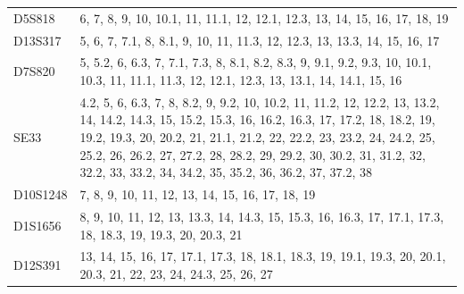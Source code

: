 \begin{theappendices}
\begin{table}[htbp]
\begin{tabularx}{\textwidth}{lX}
  D5S818 &                                                                                                                                                                                                                                                                                   6, 7, 8, 9, 10, 10.1, 11, 11.1, 12, 12.1, 12.3, 13, 14, 15, 16, 17, 18, 19 \\
 D13S317 &                                                                                                                                                                                                                                                                                    5, 6, 7, 7.1, 8, 8.1, 9, 10, 11, 11.3, 12, 12.3, 13, 13.3, 14, 15, 16, 17 \\
  D7S820 &                                                                                                                                                                                                                  5, 5.2, 6, 6.3, 7, 7.1, 7.3, 8, 8.1, 8.2, 8.3, 9, 9.1, 9.2, 9.3, 10, 10.1, 10.3, 11, 11.1, 11.3, 12, 12.1, 12.3, 13, 13.1, 14, 14.1, 15, 16 \\
    SE33 &  4.2, 5, 6, 6.3, 7, 8, 8.2, 9, 9.2, 10, 10.2, 11, 11.2, 12, 12.2, 13, 13.2, 14, 14.2, 14.3, 15, 15.2, 15.3, 16, 16.2, 16.3, 17, 17.2, 18, 18.2, 19, 19.2, 19.3, 20, 20.2, 21, 21.1, 21.2, 22, 22.2, 23, 23.2, 24, 24.2, 25, 25.2, 26, 26.2, 27, 27.2, 28, 28.2, 29, 29.2, 30, 30.2, 31, 31.2, 32, 32.2, 33, 33.2, 34, 34.2, 35, 35.2, 36, 36.2, 37, 37.2, 38 \\
D10S1248 &                                                                                                                                                                                                                                                                                                              7, 8, 9, 10, 11, 12, 13, 14, 15, 16, 17, 18, 19 \\
 D1S1656 &                                                                                                                                                                                                                                                   8, 9, 10, 11, 12, 13, 13.3, 14, 14.3, 15, 15.3, 16, 16.3, 17, 17.1, 17.3, 18, 18.3, 19, 19.3, 20, 20.3, 21 \\
 D12S391 &                                                                                                                                                                                                                                             13, 14, 15, 16, 17, 17.1, 17.3, 18, 18.1, 18.3, 19, 19.1, 19.3, 20, 20.1, 20.3, 21, 22, 23, 24, 24.3, 25, 26, 27 \\

\end{tabularx}
\end{table}
\end{theappendices}
